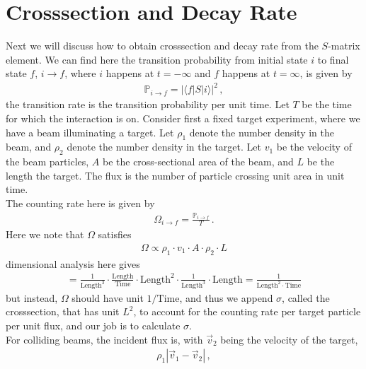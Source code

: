 \documentclass[11pt, onesided]{book}
\theoremstyle{break}
\theoremstyle{break}
\begin{document}
\section[Crosssection and Decay Rate]{\color{red}Crosssection and Decay Rate\color{black}}
Next we will discuss how to obtain crosssection and decay rate from the $S$-matrix element. We can find here the transition probability from initial state $i$ to final state $f$, $i \to f$, where $i $ happens at $t= -\infty$ and $f$ happens at $t = \infty$, is given by
\begin{align*}
\mathbb{P}_{i \to f}=\left|\langle f | S | i \rangle \right|^2\,,
\end{align*}
the transition rate is the transition probability per unit time. Let $T$ be the time for which the interaction is on. Consider first a fixed target experiment, where we have a beam illuminating a target. Let $\rho_1$ denote the number density in the beam, and $\rho_2$ denote the number density in the target. Let $v_1$ be the velocity of the beam particles, $A$ be the cross-sectional area of the beam, and $L$ be the length the target. The flux is the number of particle crossing unit area in unit time. \\

The counting rate here is given by
\begin{align*}
\Omega_{i \to f} = \frac{\mathbb{P}_{i\to f}}{T}\,.
\end{align*}
Here we note that $\Omega$ satisfies
\begin{align*}
\Omega \propto \rho_1 \cdot v_1 \cdot A \cdot \rho_2 \cdot L
\end{align*}
dimensional analysis here gives
\begin{align*}
[ \rho_1 \cdot v_1 \cdot A \cdot \rho_2 \cdot L] =\frac{1}{\text{Length}^3} \cdot \frac{\text{Length}}{\text{Time}}\cdot \text{Length}^2 \cdot \frac{1}{\text{Length}^3} \cdot \text{Length}  =\frac{1}{\text{Length}^2\cdot \text{Time}}
\end{align*}
but instead, $\Omega$ should have unit $1/\text{Time}$, and thus we append $\sigma$, called the crosssection, that has unit $L^2$, to account for the counting rate per target particle per unit flux, and our job is to calculate $\sigma$. \\

For colliding beams, the incident flux is, with $\vec{v}_2$ being the velocity of the target,
\begin{align*}
\rho_1 | \vec{v}_1 - \vec{v}_2|\,,
\end{align*}
\end{document}
